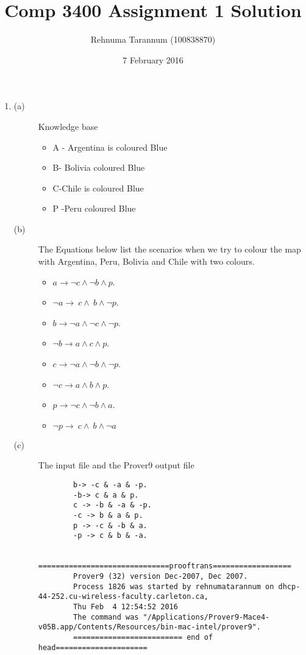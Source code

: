 \documentclass{article}
\title{Comp 3400 Assignment 1 Solution}
\author{Rehnuma Tarannum (100838870)}
\date{7 February 2016}
\begin{document}
\maketitle


\begin{enumerate}
    \item 
    \begin{description}
    \item[(a)] Knowledge base
    \begin{itemize}
        \item A - Argentina is coloured Blue
        \item B- Bolivia coloured Blue
        \item C-Chile is coloured Blue
        \item P -Peru coloured Blue
    \end{itemize}
    \item [(b)] The Equations below list the scenarios when we try to colour the map with Argentina, Peru, Bolivia and Chile with two colours.
    \begin{itemize}
        \item $ a \rightarrow \neg c \wedge \neg b \wedge p$.
        \item $ \neg a \rightarrow \ c \wedge \ b \wedge \neg p$.
        \item $ b \rightarrow \neg a \wedge \neg c \wedge \neg p$.
        \item $ \neg b \rightarrow a \wedge c \wedge p$.
        \item $ c \rightarrow \neg a \wedge \neg b \wedge \neg p$.
        \item $ \neg c \rightarrow a \wedge b \wedge p$.
        \item $ p \rightarrow \neg c \wedge \neg b \wedge a$.
        \item $ \neg p \rightarrow \ c \wedge \ b \wedge \neg a$
    \end{itemize}
    \item [(c)] The input file and the Prover9 output file
     \begin{verbatim}
        b-> -c & -a & -p.
        -b-> c & a & p.
        c -> -b & -a & -p.
        -c -> b & a & p.
        p -> -c & -b & a.
        -p -> c & b & -a.
        
        ==============================prooftrans==================
        Prover9 (32) version Dec-2007, Dec 2007.
        Process 1826 was started by rehnumatarannum on dhcp-44-252.cu-wireless-faculty.carleton.ca,
        Thu Feb  4 12:54:52 2016
        The command was "/Applications/Prover9-Mace4-v05B.app/Contents/Resources/bin-mac-intel/prover9".
        ========================= end of head=====================


\end{verbatim}
\end{description}
\end{enumerate}
\end{document}
